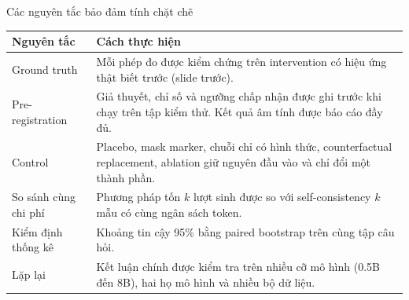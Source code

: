 \documentclass[aspectratio=169,t,10pt]{beamer}
\begin{document}
\begin{frame}{Các nguyên tắc bảo đảm tính chặt chẽ}
\small
\renewcommand{\arraystretch}{1.35}
\begin{tabularx}{\textwidth}{@{}P{3.4cm}Y@{}}
\toprule
\textbf{Nguyên tắc} & \textbf{Cách thực hiện}\\
\midrule
Ground truth & Mỗi phép đo được kiểm chứng trên intervention có hiệu ứng thật biết trước (slide trước).\\
Pre-registration & Giả thuyết, chỉ số và ngưỡng chấp nhận được ghi trước khi chạy trên tập kiểm thử. Kết quả âm tính được báo cáo đầy đủ.\\
Control & Placebo, mask marker, chuỗi chỉ có hình thức, counterfactual replacement, ablation giữ nguyên đầu vào và chỉ đổi một thành phần.\\
So sánh cùng chi phí & Phương pháp tốn $k$ lượt sinh được so với self-consistency $k$ mẫu có cùng ngân sách token.\\
Kiểm định thống kê & Khoảng tin cậy 95\% bằng paired bootstrap trên cùng tập câu hỏi.\\
Lặp lại & Kết luận chính được kiểm tra trên nhiều cỡ mô hình (0.5B đến 8B), hai họ mô hình và nhiều bộ dữ liệu.\\
\bottomrule
\end{tabularx}
\end{frame}
\end{document}
